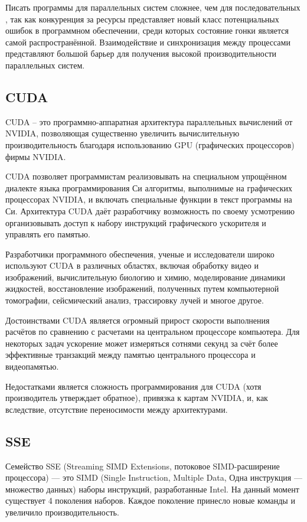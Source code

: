 Писать программы для параллельных систем сложнее, чем для последовательных \cite{bib4}, так как конкуренция за ресурсы представляет новый класс потенциальных ошибок в программном обеспечении, среди которых состояние гонки является самой распространённой. Взаимодействие и синхронизация между процессами представляют большой барьер для получения высокой производительности параллельных систем.


\subsection{CUDA}
CUDA – это программно-аппаратная архитектура параллельных вычислений от NVIDIA, позволяющая существенно увеличить вычислительную производительность благодаря использованию GPU (графических процессоров) фирмы NVIDIA.

CUDA  позволяет программистам реализовывать на специальном упрощённом диалекте языка программирования Си алгоритмы, выполнимые на графических процессорах NVIDIA, и включать специальные функции в текст программы на Си. \cite{bib5} Архитектура CUDA даёт разработчику возможность по своему усмотрению организовывать доступ к набору инструкций графического ускорителя и управлять его памятью.

Разработчики программного обеспечения, ученые и исследователи широко используют CUDA в различных областях, включая обработку видео и изображений, вычислительную биологию и химию, моделирование динамики жидкостей, восстановление изображений, полученных путем компьютерной томографии, сейсмический анализ, трассировку лучей и многое другое.

Достоинствами CUDA является огромный прирост скорости выполнения расчётов по сравнению с расчетами на центральном процессоре компьютера. Для некоторых задач ускорение может измеряться сотнями секунд за счёт более эффективные транзакций между памятью центрального процессора и видеопамятью.

Недостатками является сложность программирования для CUDA (хотя производитель утверждает обратное), привязка к картам NVIDIA, и, как вследствие, отсутствие переносимости между архитектурами.


\subsection{SSE}
Семейство SSE (Streaming SIMD Extensions, потоковое SIMD-расширение процессора) — это SIMD (Single Instruction, Multiple Data, Одна инструкция — множество данных) наборы инструкций, разработанные Intel. На данный момент существует 4 поколения наборов. Каждое поколение принесло новые команды и увеличило производительность.\cite{bib2} 

